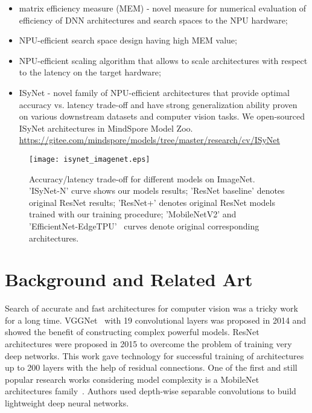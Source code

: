\documentclass[letterpaper]{article}
\begin{document}
\begin{itemize}
\item matrix efficiency measure (MEM) - novel measure for numerical evaluation of efficiency of DNN architectures and search spaces to the NPU hardware;
\item NPU-efficient search space design having high MEM value;
\item NPU-efficient scaling algorithm that allows to scale architectures with respect to the latency on the target hardware;
\item ISyNet - novel family of NPU-efficient architectures that provide optimal accuracy vs. latency trade-off and have strong generalization ability proven on various downstream datasets and computer vision tasks. We open-sourced ISyNet architectures in MindSpore Model Zoo.\\ \hyperlink{https://gitee.com/mindspore/models/tree/master/research/cv/ISyNet}{https://gitee.com/mindspore/models/tree/master/research/cv/ISyNet} 
\end{itemize}

\begin{wrapfigure}[27]{r}{75mm}
\texttt{[image: isynet\_imagenet.eps]}
\caption{Accuracy/latency trade-off for different models on ImageNet.
'ISyNet-N' curve shows our models results; 'ResNet baseline' denotes original ResNet results; 'ResNet+' denotes original ResNet models trained with our training procedure; 'MobileNetV2' and 'EfficientNet-EdgeTPU'~\cite{gupta2020acceleratoraware} curves denote original corresponding architectures.} \label{fig:isynet_imagenet}
\end{wrapfigure} 

\section{Background and Related Art} \label{background}
Search of accurate and fast architectures for computer vision was a tricky work for a long time. VGGNet~\cite{simonyan2015deep} with 19 convolutional layers was proposed in 2014 and showed the benefit of constructing complex powerful models. ResNet~\cite{he2015deep} architectures were proposed in 2015 to overcome the problem of training very deep networks. This work gave technology for successful training of architectures up to 200 layers with the help of residual connections.
One of the first and still popular research works considering model complexity is a MobileNet architectures family~\cite{howard2017mobilenets, sandler2019mobilenetv2}. Authors used depth-wise separable convolutions to build lightweight deep neural networks.
\end{document}
